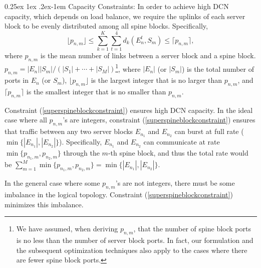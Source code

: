 \documentclass[letterpaper,twocolumn,10pt]{article}
\makeatletter
\renewcommand{\paragraph}{%
  \@startsection{paragraph}{4}%
  {\z@}{0.25ex \@plus 1ex \@minus .2ex}{-1em}%
  {\normalfont\normalsize\bfseries}%
}
\makeatother
\begin{document}
\paragraph{Capacity Constraints:}
In order to achieve high DCN capacity, which depends on load balance, we require the uplinks of each server block to be evenly distributed among all spine blocks. Specifically,
\begin{equation}\label{superspineblockconstraint}
\lfloor p_{n,m}\rfloor\leq \sum_{k=1}^K\sum_{t=1}^4 d_k(E_n^t, S_m)\leq \lceil p_{n,m}\rceil,
\end{equation}
where $p_{n,m}$ is the mean number of links between a server block and a spine block.
$p_{n,m}=|E_n||S_m|/(|S_1|+\cdots+|S_M|)$\footnote{We have assumed,  when deriving $p_{n,m}$,  that the number of spine block ports is no less than the number of server block ports. In fact, our formulation and the subsequent optimization techniques also apply to the cases where there are fewer spine block ports.}, where $|E_n|$ (or $|S_m|$) is the total number of ports in $E_n$ (or $S_m$), $\lfloor p_{n,m}\rfloor$ is the largest integer that is no larger than $p_{n,m}$, and $\lceil p_{n,m}\rceil$ is the smallest integer that is no smaller than $p_{n,m}$.

Constraint (\ref{superspineblockconstraint}) ensures high DCN capacity. In the ideal case where all $p_{n,m}$'s are integers, constraint (\ref{superspineblockconstraint}) ensures that traffic between any two server blocks $E_{n_1}$ and $E_{n_2}$ can burst at full rate ($\min\{|E_{n_1}|, |E_{n_2}|\}$). Specifically, $E_{n_1}$ and $E_{n_2}$ can communicate at rate $\min\{p_{n_1,m}, p_{n_2,m}\}$ through the $m$-th spine block, and thus the total rate would be $\sum_{m=1}^M\min\{p_{n_1,m}, p_{n_2,m}\}=\min\{|E_{n_1}|, |E_{n_2}|\}$.

In the general case where some $p_{n,m}$'s are not integers, there must be some imbalance in the logical topology. Constraint (\ref{superspineblockconstraint}) minimizes this imbalance.

\end{document}
